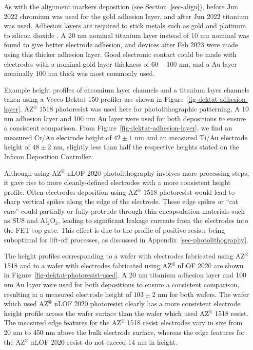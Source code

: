 \documentclass[
  a4paper,
]{scrbook}
\begin{document}
As with the alignment markers deposition (see Section~\ref{sec-align}),
before Jun 2022 chromium was used for the gold adhesion layer, and after
Jun 2022 titanium was used. Adhesion layers are required to stick metals
such as gold and platinum to silicon dioxide \autocite{Guarnieri2014}. A
20 nm nominal titanium layer instead of 10 nm nominal was found to give
better electrode adhesion, and devices after Feb 2023 were made using
this thicker adhesion layer. Good electronic contact could be made with
electrodes with a nominal gold layer thickness of \(60-100\) nm, and a
Au layer nominally 100 nm thick was most commonly used.

Example height profiles of chromium layer channels and a titanium layer
channels taken using a Veeco Dektat 150 profiler are shown in
Figure~\ref{fig-dektat-adhesion-layer}. AZ\(^\circledR\) 1518
photoresist was used here for photolithographic patterning. A 10 nm
adhesion layer and 100 nm Au layer were used for both depositions to
ensure a consistent comparison. From
Figure~\ref{fig-dektat-adhesion-layer}, we find an measured Cr/Au
electrode height of \(42\pm1\) nm and an measured Ti/Au electrode height
of \(48\pm2\) nm, slightly less than half the respective heights stated
on the Inficon Deposition Controller.

Although using AZ\(^\circledR\) nLOF 2020 photolithography involves more
processing steps, it gave rise to more cleanly-defined electrodes with a
more consistent height profile. Often electrodes deposition using
AZ\(^\circledR\) 1518 photoresist would lead to sharp vertical spikes
along the edge of the electrode. These edge spikes or ``cat ears'' could
partially or fully protrude through thin encapsulation materials such as
SU8 and Al\(_2\)O\(_3\), leading to significant leakage currents from
the electrodes into the FET top gate. This effect is due to the profile
of positive resists being suboptimal for lift-off processes, as
discussed in Appendix~\ref{sec-photolithography}.

The height profiles corresponding to a wafer with electrodes fabricated
using AZ\(^\circledR\) 1518 and to a wafer with electrodes fabricated
using AZ\(^\circledR\) nLOF 2020 are shown in
Figure~\ref{fig-dektat-photoresist-used}. A 20 nm titanium adhesion
layer and 100 nm Au layer were used for both depositions to ensure a
consistent comparison, resulting in a measured electrode height of
\(103\pm2\) nm for both wafers. The wafer which used AZ\(^\circledR\)
nLOF 2020 photoresist clearly has a more consistent electrode height
profile across the wafer surface than the wafer which used
AZ\(^\circledR\) 1518 resist. The measured edge features for the
AZ\(^\circledR\) 1518 resist electrodes vary in size from 20 nm to 450
nm above the bulk electrode surface, whereas the edge features for the
AZ\(^\circledR\) nLOF 2020 resist do not exceed 14 nm in height.
\end{document}
